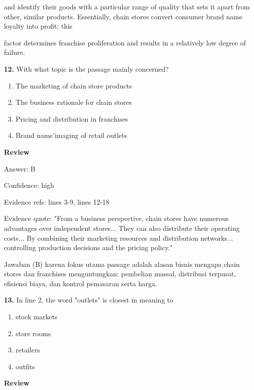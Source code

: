 \documentclass[12pt]{article}
\begin{document}
and identify their goods with a particular range of quality that sets it apart from other, similar products. Essentially, chain stores convert consumer brand name loyalty into profit; this\par
factor determines franchise proliferation and results in a relatively low degree of failure.\par
\endgroup
\medskip
\noindent\textbf{12.} With what topic is the passage mainly concerned?
\begin{enumerate}[label=(\Alph*),leftmargin=*,itemsep=0.2em]
\item The marketing of chain store products
\item The business rationale for chain stores
\item Pricing and distribution in franchises
\item Brand name'imaging of retail outlets
\end{enumerate}
\par
\begingroup
\setlength{\parskip}{0pt}
\setlength{\parindent}{0pt}
\textbf{Review}\par
Answer: B\par
Confidence: high\par
Evidence refs: lines 3-9, lines 12-18\par
Evidence quote: "From a business perspective, chain stores have numerous advantages over independent stores... They can also distribute their operating costs... By combining their marketing resources and distribution networks... controlling production decisions and the pricing policy."\par
Jawaban (B) karena fokus utama passage adalah alasan bisnis mengapa chain stores dan franchises menguntungkan: pembelian massal, distribusi terpusat, efisiensi biaya, dan kontrol pemasaran serta harga.\par
\endgroup
\par
\vspace{0.25\baselineskip}
\noindent\textbf{13.} In line 2, the word "outlets" is closest in meaning to
\begin{enumerate}[label=(\Alph*),leftmargin=*,itemsep=0.2em]
\item stock markets
\item store rooms
\item retailers
\item outfits
\end{enumerate}
\par
\begingroup
\setlength{\parskip}{0pt}
\setlength{\parindent}{0pt}
\textbf{Review}\par
\end{document}

